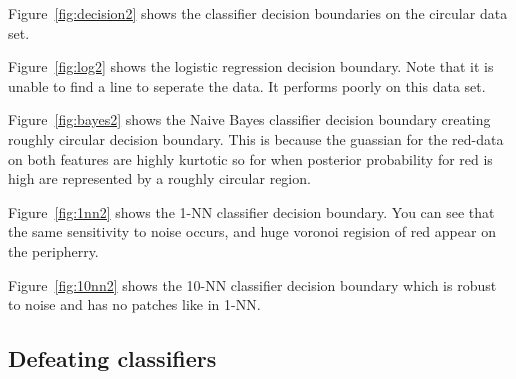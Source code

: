 \documentclass[letterpaper,10pt]{article} %
\begin{document}
Figure~\ref{fig:decision2} shows the classifier decision boundaries on the circular data set.

Figure~\ref{fig:log2} shows the logistic regression decision boundary. Note that it is unable to find a line to seperate the data. It performs poorly on this data set.

Figure~\ref{fig:bayes2} shows the Naive Bayes classifier decision boundary creating roughly circular decision boundary. This is because the guassian for the red-data on both features are highly kurtotic so for when posterior probability for red is high are represented by a roughly circular region.

Figure~\ref{fig:1nn2} shows the 1-NN classifier decision boundary. You can see that the same sensitivity to noise occurs, and huge voronoi regision of red appear on the peripherry.

Figure~\ref{fig:10nn2} shows the 10-NN classifier decision boundary which is robust to noise and has no patches like in 1-NN.

\subsection{Defeating classifiers}

%
%

\end{document}
